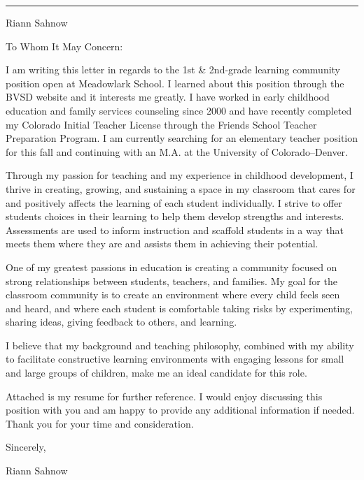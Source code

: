 \documentclass[letterpaper,10pt]{article}
\newcommand{\mblue}{\color{darkblue}}
\begin{document}
\pagestyle{empty}

{\mblue\rule{4.63in}{0.08cm}}

\vspace{-1.0pc}
\hfill{\Huge\mblue Riann Sahnow}

\vspace{2pc}
To Whom It May Concern:

\bigbreak\qquad I am writing this letter in regards to the
1st \& 2nd-grade learning community
position open at Meadowlark School. I learned about this position through
the BVSD website and it interests me greatly. I have worked in early childhood
education and family services counseling since 2000 and have recently completed
my Colorado Initial Teacher License through the Friends School Teacher Preparation
Program. I am currently searching for an elementary teacher position
for this fall and continuing with an M.A. at the University of Colorado--Denver.

\bigbreak\qquad Through my passion for teaching and my experience in
childhood development, I thrive in creating, growing, and sustaining a space in
my classroom that cares for and positively affects the learning of each student
individually. I strive to offer students choices in their learning to help them
develop strengths and interests. Assessments are used to inform instruction and
scaffold students in a way that meets them where they are and assists them in
achieving their potential.

\bigbreak\qquad One of my greatest passions in education is creating
a community focused on strong relationships between students, teachers, and
families. My goal for the classroom community is to create an environment
where every child feels seen and heard, and where each student is comfortable
taking risks by experimenting, sharing ideas, giving feedback to others, and learning.

\bigbreak\qquad I believe that my background and teaching philosophy, combined
with my ability to facilitate constructive learning environments with engaging
lessons for small and large groups of children, make me an ideal candidate for
this role.

\bigbreak\qquad Attached is my resume for further reference. I would enjoy
discussing this position with you and am happy to provide any additional
information if needed. Thank you for your time and consideration.

\bigbreak Sincerely,

\vspace{2pc} Riann Sahnow
\end{document}
